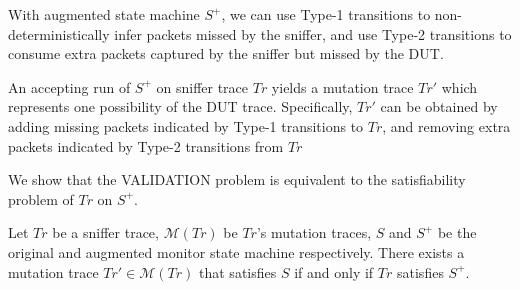 With augmented state machine $S^+$, we can use Type-1 transitions to
non-deterministically infer packets missed by the sniffer, and use Type-2
transitions to consume extra packets captured by the sniffer but missed by the
DUT.

An accepting run of $S^+$ on sniffer trace $Tr$ yields a mutation trace $Tr'$
which represents one possibility of the DUT trace. Specifically, $Tr'$ can be
obtained by adding missing packets indicated by Type-1 transitions to $Tr$, and
removing extra packets indicated by Type-2 transitions from $Tr$

We show that the VALIDATION problem is equivalent to the
satisfiability problem of $Tr$ on $S^+$.

\begin{theorem}
    Let $Tr$ be a sniffer trace, $\mathcal{M}(Tr)$ be $Tr$'s mutation traces, $S$
    and $S^+$ be the original and augmented monitor state machine respectively.
  There exists a mutation trace $Tr' \in \mathcal{M}(Tr)$ that satisfies $S$ if
  and only if $Tr$ satisfies $S^+$.
 \label{the:equivalent}
\end{theorem}
